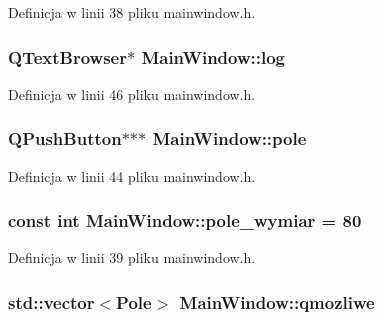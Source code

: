 \-Definicja w linii 38 pliku mainwindow.\-h.

\hypertarget{class_main_window_aca8da845b050d554d5e6f335c6f143c7}{
\subsubsection[{log}]{\setlength{\rightskip}{0pt plus 5cm}\-Q\-Text\-Browser$\ast$ {\bf \-Main\-Window\-::log}}}\label{class_main_window_aca8da845b050d554d5e6f335c6f143c7}


\-Definicja w linii 46 pliku mainwindow.\-h.

\hypertarget{class_main_window_a9ef49c25c7693c691076e6b46b45db76}{
\subsubsection[{pole}]{\setlength{\rightskip}{0pt plus 5cm}\-Q\-Push\-Button$\ast$$\ast$$\ast$ {\bf \-Main\-Window\-::pole}}}\label{class_main_window_a9ef49c25c7693c691076e6b46b45db76}


\-Definicja w linii 44 pliku mainwindow.\-h.

\hypertarget{class_main_window_adbea6fe4608b0ced586b96bfcd4456ce}{
\subsubsection[{pole\-\_\-wymiar}]{\setlength{\rightskip}{0pt plus 5cm}const int {\bf \-Main\-Window\-::pole\-\_\-wymiar} = 80}}\label{class_main_window_adbea6fe4608b0ced586b96bfcd4456ce}


\-Definicja w linii 39 pliku mainwindow.\-h.

\hypertarget{class_main_window_a9081d2e6cde7089a308fd4c738d722dd}{
\subsubsection[{qmozliwe}]{\setlength{\rightskip}{0pt plus 5cm}std\-::vector$<${\bf \-Pole}$>$ {\bf \-Main\-Window\-::qmozliwe}}}\label{class_main_window_a9081d2e6cde7089a308fd4c738d722dd}


